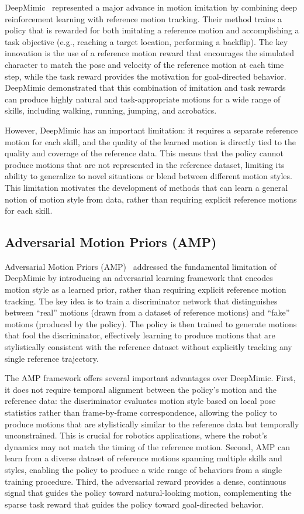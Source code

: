 DeepMimic~\cite{peng2018deepmimic} represented a major advance in motion imitation by combining deep reinforcement learning with reference motion tracking. Their method trains a policy that is rewarded for both imitating a reference motion and accomplishing a task objective (e.g., reaching a target location, performing a backflip). The key innovation is the use of a reference motion reward that encourages the simulated character to match the pose and velocity of the reference motion at each time step, while the task reward provides the motivation for goal-directed behavior. DeepMimic demonstrated that this combination of imitation and task rewards can produce highly natural and task-appropriate motions for a wide range of skills, including walking, running, jumping, and acrobatics.

However, DeepMimic has an important limitation: it requires a separate reference motion for each skill, and the quality of the learned motion is directly tied to the quality and coverage of the reference data. This means that the policy cannot produce motions that are not represented in the reference dataset, limiting its ability to generalize to novel situations or blend between different motion styles. This limitation motivates the development of methods that can learn a general notion of motion style from data, rather than requiring explicit reference motions for each skill.

\subsection{Adversarial Motion Priors (AMP)}

Adversarial Motion Priors (AMP)~\cite{peng2021amp} addressed the fundamental limitation of DeepMimic by introducing an adversarial learning framework that encodes motion style as a learned prior, rather than requiring explicit reference motion tracking. The key idea is to train a discriminator network that distinguishes between ``real'' motions (drawn from a dataset of reference motions) and ``fake'' motions (produced by the policy). The policy is then trained to generate motions that fool the discriminator, effectively learning to produce motions that are stylistically consistent with the reference dataset without explicitly tracking any single reference trajectory.

The AMP framework offers several important advantages over DeepMimic. First, it does not require temporal alignment between the policy's motion and the reference data: the discriminator evaluates motion style based on local pose statistics rather than frame-by-frame correspondence, allowing the policy to produce motions that are stylistically similar to the reference data but temporally unconstrained. This is crucial for robotics applications, where the robot's dynamics may not match the timing of the reference motion. Second, AMP can learn from a diverse dataset of reference motions spanning multiple skills and styles, enabling the policy to produce a wide range of behaviors from a single training procedure. Third, the adversarial reward provides a dense, continuous signal that guides the policy toward natural-looking motion, complementing the sparse task reward that guides the policy toward goal-directed behavior.

